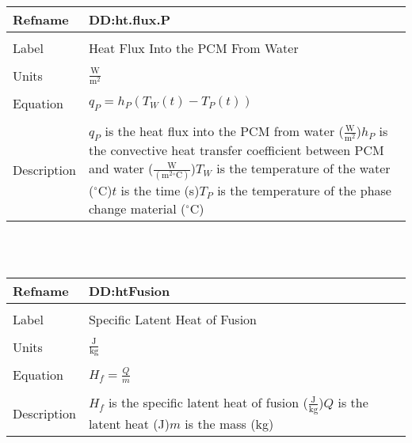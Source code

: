 \documentclass[12pt]{article}
\begin{document}
\noindent \begin{minipage}{\textwidth}
\begin{tabular}{p{} p{}}
\toprule \textbf{Refname} & \textbf{DD:ht.flux.P}
\label{DD:ht.flux.P}
\\ \midrule \\
Label & Heat Flux Into the PCM From Water
\\ \midrule \\
Units & $\frac{\text{W}}{\text{m}^{2}}$
\\ \midrule \\
Equation & ${q_{P}}={h_{P}} \left({T_{W}}\left(t\right)-{T_{P}}\left(t\right)\right)$
\\ \midrule \\
Description & ${q_{P}}$ is the heat flux into the PCM from water ($\frac{\text{W}}{\text{m}^{2}}$)\newline${h_{P}}$ is the convective heat transfer coefficient between PCM and water ($\frac{\text{W}}{(\text{m}^{2}{}^{\circ}\text{C})}$)\newline${T_{W}}$ is the temperature of the water (${}^{\circ}$C)\newline$t$ is the time (s)\newline${T_{P}}$ is the temperature of the phase change material (${}^{\circ}$C)
\\ \bottomrule \end{tabular}
\end{minipage}\\
~\newline
\noindent \begin{minipage}{\textwidth}
\begin{tabular}{p{} p{}}
\toprule \textbf{Refname} & \textbf{DD:htFusion}
\label{DD:htFusion}
\\ \midrule \\
Label & Specific Latent Heat of Fusion
\\ \midrule \\
Units & $\frac{\text{J}}{\text{kg}}$
\\ \midrule \\
Equation & ${H_{f}}=\frac{Q}{m}$
\\ \midrule \\
Description & ${H_{f}}$ is the specific latent heat of fusion ($\frac{\text{J}}{\text{kg}}$)\newline$Q$ is the latent heat (J)\newline$m$ is the mass (kg)
\\ \bottomrule \end{tabular}
\end{minipage}\\
\end{document}
